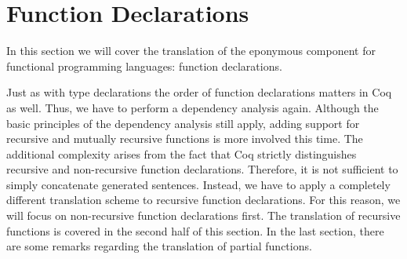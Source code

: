 \section{Function Declarations} \label{sec:translation:func-decl}
In this section we will cover the translation of the eponymous component for functional programming languages: function declarations.

Just as with type declarations the order of function declarations matters in Coq as well.
Thus, we have to perform a dependency analysis again.
Although the basic principles of the dependency analysis still apply, adding support for recursive and mutually recursive functions is more involved this time.
The additional complexity arises from the fact that Coq strictly distinguishes recursive and non-recursive function declarations.
Therefore, it is not sufficient to simply concatenate generated sentences.
Instead, we have to apply a completely different translation scheme to recursive function declarations.
For this reason, we will focus on non-recursive function declarations first.
The translation of recursive functions is covered in the second half of this section.
In the last section, there are some remarks regarding the translation of partial functions.

